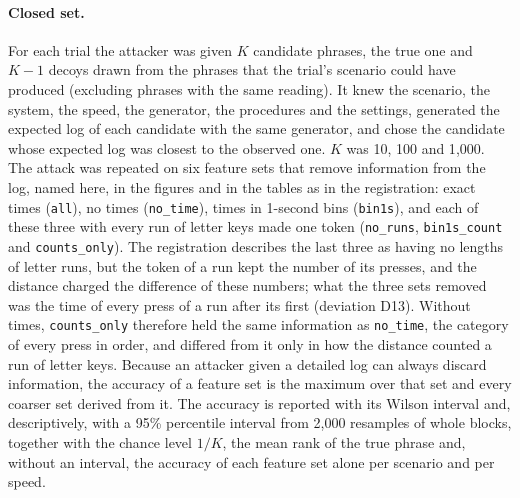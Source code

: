 \paragraph{Closed set.} For each trial the attacker was given $K$ candidate phrases, the true one and $K-1$ decoys
drawn from the phrases that the trial's scenario could have produced (excluding phrases with the same reading). It
knew the scenario, the system, the speed, the generator, the procedures and the settings, generated the expected log
of each candidate with the same generator, and chose the candidate whose expected log was closest to the observed
one. $K$ was 10, 100 and 1{,}000. The attack was repeated on six feature sets that remove information from the log,
named here, in the figures and in the tables as in the registration: exact times (\texttt{all}), no times
(\texttt{no\_time}), times in 1-second bins (\texttt{bin1s}), and each of these three with every run of letter keys
made one token (\texttt{no\_runs}, \texttt{bin1s\_count} and \texttt{counts\_only}). The registration describes the
last three as having no lengths of letter runs, but the token of a run kept the number of its presses, and the distance
charged the difference of these numbers; what the three sets removed was the time of every press of a run after its
first (deviation D13). Without times, \texttt{counts\_only} therefore held the same information as \texttt{no\_time},
the category of every press in order, and differed from it only in how the distance counted a run of letter keys.
Because an attacker given a detailed log can always discard
information, the accuracy of a feature set is the maximum over that set and every coarser set derived from it. The
accuracy is reported with its Wilson interval and, descriptively, with a 95\% percentile interval from 2{,}000
resamples of whole blocks, together with the chance level $1/K$, the mean rank of the true phrase and, without an
interval, the accuracy of each feature set alone per scenario and per speed.

